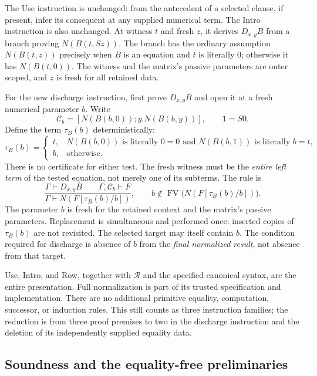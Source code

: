 The Use instruction is unchanged: from the antecedent of a selected
clause, if present, infer its consequent at any supplied numerical term.
The Intro instruction is also unchanged.  At witness $t$ and fresh $z$,
it derives $D_{x,y}B$ from a branch proving $N(B(t,Sz))$.  The branch has
the ordinary assumption $N(B(t,z))$ precisely when $B$ is an equation and
$t$ is literally $0$; otherwise it has $N(B(t,0))$.  The witness and the
matrix's passive parameters are outer scoped, and $z$ is fresh for all
retained data.

For the new discharge instruction, first prove $D_{x,y}B$ and open it at
a fresh numerical parameter $b$.  Write
\[
 \mathcal C_b=[N(B(b,0));y.N(B(b,y))],\qquad 1=S0.
\]
Define the term $\tau_B(b)$ deterministically:
\begin{equation}
 \tau_B(b)=
 \begin{cases}
 t,&N(B(b,0))\text{ is literally }0=0
       \text{ and }N(B(b,1))\text{ is literally }b=t,\\
 b,&\text{otherwise}.
 \end{cases}
 \label{eq:row-target}
\end{equation}
There is no certificate for either test.  The fresh witness must be the
\emph{entire left term} of the tested equation, not merely one of its
subterms.  The rule is
\begin{equation}
 \frac{\Gamma\vdash D_{x,y}B\qquad
       \Gamma,\mathcal C_b\vdash F}
      {\Gamma\vdash N(F[\tau_B(b)/b])},
 \qquad b\notin\operatorname{FV}\bigl(N(F[\tau_B(b)/b])\bigr).
 \tag{Row}
 \label{rule:first-row}
\end{equation}
The parameter $b$ is fresh for the retained context and the matrix's
passive parameters.  Replacement is simultaneous and performed once:
inserted copies of $\tau_B(b)$ are not revisited.  The selected target may
itself contain $b$.  The condition required for discharge is absence of
$b$ from the \emph{final normalized result}, not absence from that target.

Use, Intro, and Row, together with $\mathcal R$ and the specified canonical
syntax, are the entire presentation.  Full normalization is part of its
trusted specification and implementation.  There are no additional
primitive equality, computation, successor, or induction rules.  This
still counts as three instruction families; the reduction is from three
proof premises to two in the discharge instruction and the deletion of
its independently supplied equality data.

\subsection{Soundness and the equality-free preliminaries}

